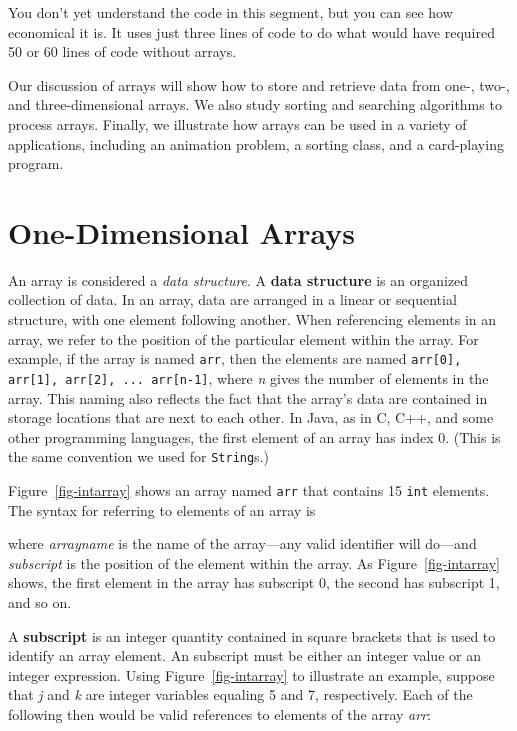 \noindent You don't yet understand the code in this segment, but you can
see how economical it is. It uses just three lines of code to do what
would have required 50 or 60 lines of code without arrays. 

Our discussion of arrays will show how to store and retrieve data from
one-, two-, and three-dimensional arrays.  We also study sorting and
searching algorithms to process arrays. Finally, we illustrate how
arrays can be used in a variety of applications, including an
animation problem, a sorting class, and a card-playing \mbox{program.}

\section{One-Dimensional Arrays}

\noindent An array is considered a {\em data structure}. A {\bf data
structure} is an organized collection of data. In an array, data are
arranged  in a linear or
sequential structure, with one element following another.  When
referencing elements in an array, we refer to the position of the
particular element within the array. For example, if the array is
named {\tt arr}, then the elements are named
\verb|arr[0], arr[1], arr[2], ... arr[n-1]|, where {\it n} gives the
number of elements in the array.  This naming also reflects the fact
that the array's data are contained in storage locations that are next
to each other. In Java, as in C, C++, and some other programming
languages, the first element of an array has index 0.
(This is the same convention we used for {\tt String}s.)

\begin{figure}[h!]
\end{figure}
Figure~\ref{fig-intarray} shows an array named {\tt arr} that
contains 15 {\tt int} elements.  
The syntax for referring to elements of an array is


\noindent where {\it arrayname} is the name of the array---any valid
identifier will do---and {\it subscript} is the position of the
element within the array. As Figure~\ref{fig-intarray} shows, the
first element in the array has subscript 0, the second has subscript
1, and so on.


A {\bf subscript} is an integer quantity contained in square brackets
that is used to identify an array element. An subscript must be
either an integer value or an integer
expression.  Using Figure~\ref{fig-intarray} to illustrate an example,
suppose that {\it j} and {\it k} are integer variables equaling 5 and
7, respectively.  Each of the following then would be valid references
to elements of the array {\it arr}:

